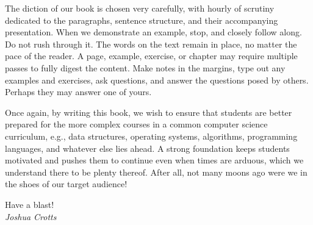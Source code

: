 The diction of our book is chosen very carefully, with hourly of scrutiny dedicated to the paragraphs, sentence structure, and their accompanying presentation.
When we demonstrate an example, stop, and closely follow along.
Do not rush through it.
The words on the text remain in place, no matter the pace of the reader.
A page, example, exercise, or chapter may require multiple passes to fully digest the content.
Make notes in the margins, type out any examples and exercises, ask questions, and answer the questions posed by others.
Perhaps they may answer one of yours.

Once again, by writing this book, we wish to ensure that students are better prepared for the more complex courses in a common computer science curriculum, e.g., data structures, operating systems, algorithms, programming languages, and whatever else lies ahead. 
A strong foundation keeps students motivated and pushes them to continue even when times are arduous, which we understand there to be plenty thereof.
After all, not many moons ago were we in the shoes of our target audience!

\begin{flushright}
Have a blast!\\\emph{Joshua Crotts}
\end{flushright}